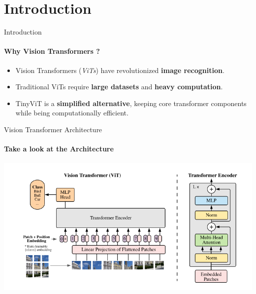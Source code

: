 \section{Introduction}

\begin{frame}{Introduction}
  \framesubtitle{Why Vision Transformers ?}
  \begin{itemize}
    \item Vision Transformers (\textit{ViTs}) have revolutionized \textbf{image recognition}.
    \item Traditional ViTs require \textbf{large datasets} and \textbf{heavy computation}.
    \item TinyViT is a \textbf{simplified alternative}, keeping core transformer components while being computationally efficient.
  \end{itemize}
\end{frame}

\begin{frame}{Vision Transformer Architecture}
  \framesubtitle{Take a look at the Architecture}
  \includegraphics[width=\textwidth]{images/vit-architecture.png}
\end{frame}

